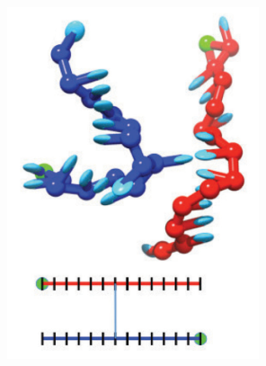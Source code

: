 \begin{figure}[ht]
  \begin{centering}
  \hspace{-0.3cm}
  \begin{subfigure}[t]{\dimexpr.2\linewidth-1.3em\relax}
  \centering
  \includegraphics[width=1.06\linewidth,valign=t]{Figures/hybridDiag1.png}
  \end{subfigure}%
  \hspace{-0.35cm}
  \begin{subfigure}[t]{\dimexpr.2\linewidth-1.3em\relax}
  \centering

\end{subfigure}
\end{centering}
\end{figure}
